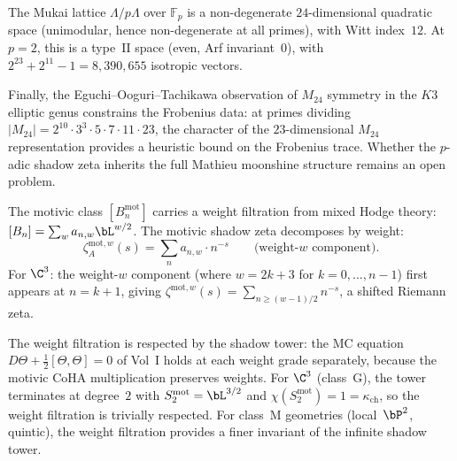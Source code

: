 \begin{remark}[The \texorpdfstring{$p$}{p}-adic shadow for \texorpdfstring{$K3$}{K3} at \texorpdfstring{$d=2$}{d=2}]
The Mukai lattice $\Lambda / p\Lambda$ over $\mathbb{F}_p$ is a non-degenerate $24$-dimensional quadratic space (unimodular, hence non-degenerate at all primes), with Witt index~$12$. At $p=2$, this is a type~II space (even, Arf invariant~$0$), with $2^{23} + 2^{11} - 1 = 8{,}390{,}655$ isotropic vectors.

Finally, the Eguchi--Ooguri--Tachikawa observation of $M_{24}$ symmetry in the $K3$ elliptic genus constrains the Frobenius data: at primes dividing $|M_{24}| = 2^{10} \cdot 3^3 \cdot 5 \cdot 7 \cdot 11 \cdot 23$, the character of the $23$-dimensional $M_{24}$ representation provides a heuristic bound on the Frobenius trace. Whether the $p$-adic shadow zeta inherits the full Mathieu moonshine structure remains an open problem.
\end{remark}

\begin{remark}
\label{rem:weight-filtration-shadow}
The motivic class $[B_n^{\mathrm{mot}}]$ carries a weight filtration from mixed Hodge theory: $[B_n] = \sum_w a_{n,w} \bL^{w/2}$. The motivic shadow zeta decomposes by weight:
\[
 \zeta_A^{\mathrm{mot},w}(s) = \sum_n a_{n,w} \cdot n^{-s} \qquad\text{(weight-$w$ component)}.
\]
For $\C^3$: the weight-$w$ component (where $w = 2k+3$ for $k = 0, \ldots, n-1$) first appears at $n = k + 1$, giving $\zeta^{\mathrm{mot},w}(s) = \sum_{n \geq (w-1)/2} n^{-s}$, a shifted Riemann zeta.

The weight filtration is respected by the shadow tower: the MC equation $D\Theta + \tfrac{1}{2}[\Theta, \Theta] = 0$ of Vol~I holds at each weight grade separately, because the motivic CoHA multiplication preserves weights. For $\C^3$ (class~G), the tower terminates at degree~$2$ with $S_2^{\mathrm{mot}} = \bL^{3/2}$ and $\chi(S_2^{\mathrm{mot}}) = 1 = \kappa_{\mathrm{ch}}$, so the weight filtration is trivially respected. For class~M geometries (local~$\bP^2$, quintic), the weight filtration provides a finer invariant of the infinite shadow tower.
\end{remark}

